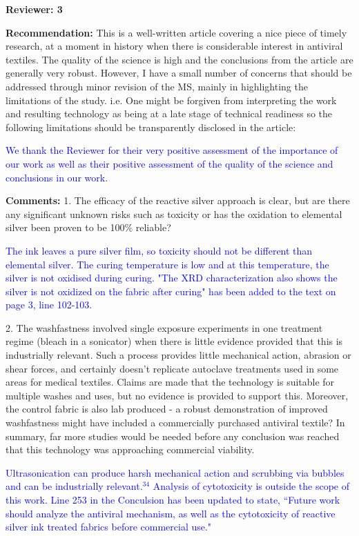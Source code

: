 \documentclass[12pt]{letter}
\newcommand{\blue}[1]{\textcolor{blue}{#1}} %
\begin{document}
\newpage
\textbf{Reviewer: 3}

\textbf{Recommendation:} This is a well-written article covering a nice piece of timely research, at a moment in history when there is considerable interest in antiviral textiles. The quality of the science is high and the conclusions from the article are generally very robust. However, I have a small number of concerns that should be addressed through minor revision of the MS, mainly in highlighting the limitations of the study. i.e. One might be forgiven from interpreting the work and resulting technology as being at a late stage of technical readiness so the following limitations should be transparently disclosed in the article:

\blue{We thank the Reviewer for their very positive assessment of the importance of our work as well as their positive assessment of the quality of the science and conclusions in our work.  }

\textbf{Comments:} 
1. The efficacy of the reactive silver approach is clear, but are there any significant unknown risks such as toxicity or has the oxidation to elemental silver been proven to be 100\% reliable?

\blue{The ink leaves a pure silver film, so toxicity should not be different than elemental silver. The curing temperature is low and at this temperature, the silver is not oxidised during curing. "The XRD characterization also shows the silver is not oxidized on the fabric after curing" has been added to the text on page 3, line 102-103. %
}

2. The washfastness involved single exposure experiments in one treatment regime (bleach in a sonicator) when there is little evidence provided that this is industrially relevant. Such a process provides little mechanical action, abrasion or shear forces, and certainly doesn't replicate autoclave treatments used in some areas for medical textiles. Claims are made that the technology is suitable for multiple washes and uses, but no evidence is provided to support this. Moreover, the control fabric is also lab produced - a robust demonstration of improved washfastness might have included a commercially purchased antiviral textile? In summary, far more studies would be needed before any conclusion was reached that this technology was approaching commercial viability.

\blue{Ultrasonication can produce harsh mechanical action and scrubbing via bubbles and can be industrially relevant.$^{34}$ Analysis of cytotoxicity is outside the scope of this work.  Line 253 in the Conculsion has been updated to state, 
``Future work should analyze the antiviral mechanism, as well as the cytotoxicity of reactive silver ink treated fabrics before
commercial use."}
\end{document}
